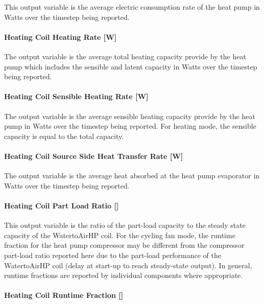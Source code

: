 This output variable is the average electric consumption rate of the heat pump in Watts over the timestep being reported.

\paragraph{Heating Coil Heating Rate {[}W{]}}\label{heating-coil-heating-rate-w-3}

The output variable is the average total heating capacity provide by the heat pump which includes the sensible and latent capacity in Watts over the timestep being reported.

\paragraph{Heating Coil Sensible Heating Rate {[}W{]}}\label{heating-coil-sensible-heating-rate-w-1}

The output variable is the average sensible heating capacity provide by the heat pump in Watts over the timestep being reported. For heating mode, the sensible capacity is equal to the total capacity.

\paragraph{Heating Coil Source Side Heat Transfer Rate {[}W{]}}\label{heating-coil-source-side-heat-transfer-rate-w-1}

The output variable is the average heat absorbed at the heat pump evaporator in Watts over the timestep being reported.

\paragraph{Heating Coil Part Load Ratio {[]}}\label{heating-coil-part-load-ratio-1}

This output variable is the ratio of the part-load capacity to the steady state capacity of the WatertoAirHP coil. For the cycling fan mode, the runtime fraction for the heat pump compressor may be different from the compressor part-load ratio reported here due to the part-load performance of the WatertoAirHP coil (delay at start-up to reach steady-state output). In general, runtime fractions are reported by individual components where appropriate.

\paragraph{Heating Coil Runtime Fraction {[]}}\label{heating-coil-runtime-fraction-7}

